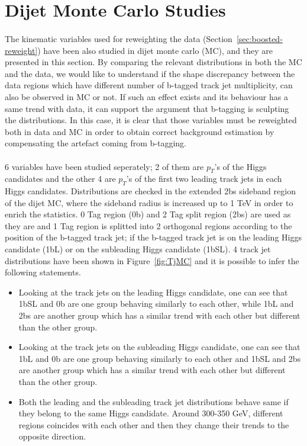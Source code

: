 \section{Dijet Monte Carlo Studies} %
\label{app:dijetMC_studies}

\paragraph{}
The kinematic variables used for reweighting the data (Section~\ref{sec:boosted-reweight}) have been also studied in dijet monte carlo (MC), and they are presented in this section. By comparing the relevant distributions in both the MC and the data, we would like to understand if the shape discrepancy between the data regions which have different number of b-tagged track jet multiplicity, can also be observed in MC or not. If such an effect exists and its behaviour has a same trend with data, it can support the argument that b-tagging is sculpting the distributions. In this case, it is clear that those variables must be reweighted both in data and MC in order to obtain correct background estimation by compensating the artefact coming from b-tagging.

\paragraph{}
6 variables have been studied seperately; 2 of them are $p_{T}$'s of the Higgs candidates and the other 4 are $p_{T}$'s of the first two leading track jets in each Higgs candidates. Distributions are checked in the extended 2bs sideband region of the dijet MC, where the sideband radius is increased up to 1 TeV in order to enrich the statistics.  0 Tag region (0b) and 2 Tag split region (2bs) are used as they are and 1 Tag region is splitted into 2 orthogonal regions according to the position of the b-tagged track jet; if the b-tagged track jet is on the leading Higgs candidate (1bL) or on the subleading Higgs candidate (1bSL). 4 track jet distributions have been shown in Figure~\ref{fig:TjMC} and it is possible to infer the following statements.

\begin{itemize}
\item Looking at the track jets on the leading Higgs candidate, one can see that 1bSL and 0b are one group behaving similarly to each other, while 1bL and 2bs are another group which has a similar trend with each other but different than the other group. 
\item Looking at the track jets on the subleading Higgs candidate, one can see that 1bL and 0b are one group behaving similarly to each other and 1bSL and 2bs are another group which has a similar trend with each other but different than the other group.
\item Both the leading and the subleading track jet distributions behave same if they belong to the same Higgs candidate. Around 300-350 GeV, different regions coincides with each other and then they change their trends to the opposite direction.
\end{itemize}
 
